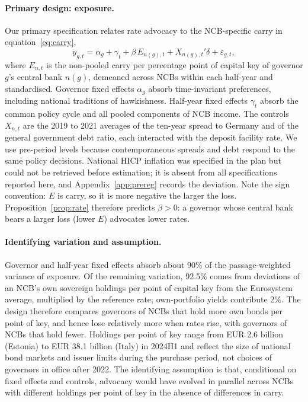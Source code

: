 \documentclass[11pt]{article}
\theoremstyle{plain}
\begin{document}
\paragraph{Primary design: exposure.}
Our primary specification relates rate advocacy to the NCB-specific carry in equation~\eqref{eq:carry},
\begin{equation}\label{eq:dose}
y_{g,t} = \alpha_g + \gamma_t + \beta\, E_{n(g),t} + X_{n(g),t}'\delta + \varepsilon_{g,t},
\end{equation}
where $E_{n,t}$ is the non-pooled carry per percentage point of capital key of governor $g$'s central bank $n(g)$, demeaned across NCBs within each half-year and standardised. Governor fixed effects $\alpha_g$ absorb time-invariant preferences, including national traditions of hawkishness. Half-year fixed effects $\gamma_t$ absorb the common policy cycle and all pooled components of NCB income. The controls $X_{n,t}$ are the 2019 to 2021 averages of the ten-year spread to Germany and of the general government debt ratio, each interacted with the deposit facility rate. We use pre-period levels because contemporaneous spreads and debt respond to the same policy decisions. National HICP inflation was specified in the plan but could not be retrieved before estimation; it is absent from all specifications reported here, and Appendix~\ref{app:prereg} records the deviation. Note the sign convention: $E$ is carry, so it is more negative the larger the loss. Proposition~\ref{prop:rate} therefore predicts $\beta>0$: a governor whose central bank bears a larger loss (lower $E$) advocates lower rates.

\paragraph{Identifying variation and assumption.}
Governor and half-year fixed effects absorb about 90\% of the passage-weighted variance of exposure. Of the remaining variation, 92.5\% comes from deviations of an NCB's own sovereign holdings per point of capital key from the Eurosystem average, multiplied by the reference rate; own-portfolio yields contribute 2\%. The design therefore compares governors of NCBs that hold more own bonds per point of key, and hence lose relatively more when rates rise, with governors of NCBs that hold fewer. Holdings per point of key range from EUR 2.6 billion (Estonia) to EUR 38.1 billion (Italy) in 2024H1 and reflect the size of national bond markets and issuer limits during the purchase period, not choices of governors in office after 2022. The identifying assumption is that, conditional on fixed effects and controls, advocacy would have evolved in parallel across NCBs with different holdings per point of key in the absence of differences in carry.
\end{document}
